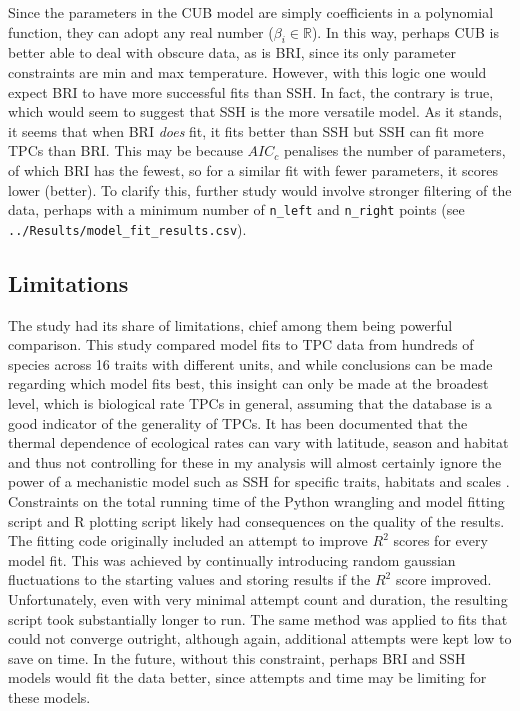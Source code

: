\documentclass[11pt]{article}
\begin{document}
        Since the parameters in the CUB model are simply coefficients in a polynomial function, they can adopt any real number ($\beta_i \in \mathbb{R}$). In this way, perhaps CUB is better able to deal with obscure data, as is BRI, since its only parameter constraints are min and max temperature. However, with this logic one would expect BRI to have more successful fits than SSH. In fact, the contrary is true, which would seem to suggest that SSH is the more versatile model. As it stands, it seems that when BRI \textit{does} fit, it fits better than SSH but SSH can fit more TPCs than BRI. This may be because $AIC_c$ penalises the number of parameters, of which BRI has the fewest, so for a similar fit with fewer parameters, it scores lower (better). To clarify this, further study would involve stronger filtering of the data, perhaps with a minimum number of \texttt{n\_left} and \texttt{n\_right} points (see \texttt{../Results/model\_fit\_results.csv}). 

        \subsection{Limitations}
        The study had its share of limitations, chief among them being powerful comparison. This study compared model fits to TPC data from hundreds of species across 16 traits with different units, and while conclusions can be made regarding which model fits best, this insight can only be made at the broadest level, which is biological rate TPCs in general, assuming that the database is a good indicator of the generality of TPCs. It has been documented that the thermal dependence of ecological rates can vary with latitude, season and habitat and thus not controlling for these in my analysis will almost certainly ignore the power of a mechanistic model such as SSH for specific traits, habitats and scales . Constraints on the total running time of the Python wrangling and model fitting script and R plotting script likely had consequences on the quality of the results. The fitting code originally included an attempt to improve $R^2$ scores for every model fit. This was achieved by continually introducing random gaussian fluctuations to the starting values and storing results if the $R^2$ score improved. Unfortunately, even with very minimal attempt count and duration, the resulting script took substantially longer to run. The same method was applied to fits that could not converge outright, although again, additional attempts were kept low to save on time. In the future, without this constraint, perhaps BRI and SSH models would fit the data better, since attempts and time may be limiting for these models.
\end{document}

